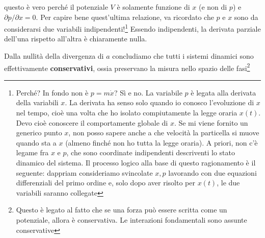 \documentclass[a4paper,openany]{article}
\begin{document}
	questo è vero perché il potenziale $V$ è solamente funzione di $x$ (e non di $p$) e $\partial p/\partial x = 0$. Per capire bene quest'ultima relazione, va ricordato che $p$ e $x$ sono da considerarsi due variabili indipendenti!\footnote{Perché? In fondo non è $p = m\dot{x}$? Sì e no. La variabile $p$ è legata alla derivata della variabili $x$. La derivata ha senso solo quando io conosco l'evoluzione di $x$ nel tempo, cioè una volta che ho isolato compiutamente la legge oraria $x(t)$. Devo cioè conoscere il comportamente globale di $x$. Se mi viene fornito un generico punto $x$, non posso sapere anche a che velocità la particella si muove quando sta a $x$ (almeno finché non ho tutta la legge oraria). A priori, non c'è legame fra $x$ e $p$, che sono coordinate indipendenti descriventi lo stato dinamico del sistema. Il processo logico alla base di questo ragionamento è il seguente: dappriam consideriamo svincolate $x,p$ lavorando con due equazioni differenziali del primo ordine e, solo dopo aver risolto per $x(t)$, le due variabili saranno collegate} Essendo indipendenti, la derivata parziale dell'una rispetto all'altra è chiaramente nulla.
	
	Dalla nullità della divergenza di $a$ concludiamo che tutti i sistemi dinamici sono effettivamente \textbf{conservativi}, ossia preservano la misura nello spazio delle fasi\footnote{Questo è legato al fatto che se una forza può essere scritta come un potenziale, allora è conservativa. Le interazioni fondamentali sono assunte conservative}
	
\end{document}
